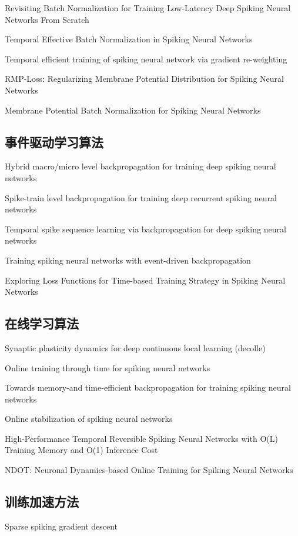\documentclass{SCIS2020cn}
\begin{document}
Revisiting Batch Normalization for Training Low-Latency Deep Spiking Neural Networks From Scratch

Temporal Effective Batch Normalization in Spiking Neural Networks

Temporal efficient training of spiking neural network via gradient re-weighting

RMP-Loss: Regularizing Membrane Potential Distribution for Spiking Neural Networks

Membrane Potential Batch Normalization for Spiking Neural Networks


\subsection{事件驱动学习算法}%

Hybrid macro/micro level backpropagation for training deep spiking neural networks

Spike-train level backpropagation for training deep recurrent spiking neural networks

Temporal spike sequence learning via backpropagation for deep spiking neural networks

Training spiking neural networks with event-driven backpropagation

Exploring Loss Functions for Time-based Training Strategy in Spiking Neural Networks

\subsection{在线学习算法}%

Synaptic plasticity dynamics for deep continuous local learning (decolle)

Online training through time for spiking neural networks

Towards memory-and time-efficient backpropagation for training spiking neural networks

Online stabilization of spiking neural networks

High-Performance Temporal Reversible Spiking Neural Networks with O(L) Training Memory and O(1) Inference Cost

NDOT: Neuronal Dynamics-based Online Training for Spiking Neural Networks


\subsection{训练加速方法}
Sparse spiking gradient descent
\end{document}
